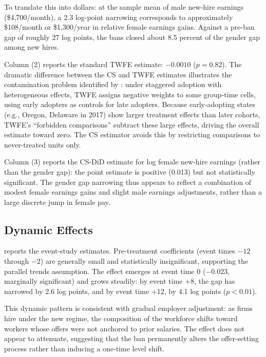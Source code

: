 \documentclass[12pt]{article}
\begin{document}
To translate this into dollars: at the sample mean of male new-hire earnings (\$4,700/month), a 2.3 log-point narrowing corresponds to approximately \$108/month or \$1,300/year in relative female earnings gains. Against a pre-ban gap of roughly 27 log points, the bans closed about 8.5 percent of the gender gap among new hires.

Column (2) reports the standard TWFE estimate: $-0.0010$ ($p = 0.82$). The dramatic difference between the CS and TWFE estimates illustrates the contamination problem identified by \citet{GoodmanBacon2021}: under staggered adoption with heterogeneous effects, TWFE assigns negative weights to some group-time cells, using early adopters as controls for late adopters. Because early-adopting states (e.g., Oregon, Delaware in 2017) show larger treatment effects than later cohorts, TWFE's ``forbidden comparisons'' subtract these large effects, driving the overall estimate toward zero. The CS estimator avoids this by restricting comparisons to never-treated units only.

Column (3) reports the CS-DiD estimate for log female new-hire earnings (rather than the gender gap): the point estimate is positive (0.013) but not statistically significant. The gender gap narrowing thus appears to reflect a combination of modest female earnings gains and slight male earnings adjustments, rather than a large discrete jump in female pay.

\subsection{Dynamic Effects}



 reports the event-study estimates. Pre-treatment coefficients (event times $-12$ through $-2$) are generally small and statistically insignificant, supporting the parallel trends assumption. The effect emerges at event time 0 ($-0.023$, marginally significant) and grows steadily: by event time +8, the gap has narrowed by 2.6 log points, and by event time +12, by 4.1 log points ($p < 0.01$).

This dynamic pattern is consistent with gradual employer adjustment: as firms hire under the new regime, the composition of the workforce shifts toward workers whose offers were not anchored to prior salaries. The effect does not appear to attenuate, suggesting that the ban permanently alters the offer-setting process rather than inducing a one-time level shift.
\end{document}
